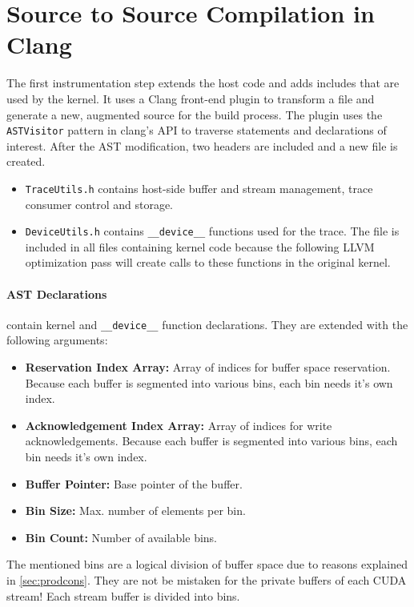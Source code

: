 \section{Source to Source Compilation in Clang}\label{sec:impl:clang}
The first instrumentation step extends the host code and adds includes that are used by the kernel. It uses a Clang front-end plugin to transform a file and generate a new, augmented source for the build process. The plugin uses the \verb|ASTVisitor|
pattern in clang's API to traverse statements and declarations of interest.
After the AST modification, two headers are included and a new file is created.

\begin{itemize}
	\item \verb|TraceUtils.h| contains host-side buffer and stream management, trace consumer control and storage.
	\item \verb|DeviceUtils.h| contains \verb|__device__| functions used for the trace. The file is included in all
	files containing kernel code because the following LLVM optimization pass will create calls to these functions in the original kernel.
\end{itemize}

\paragraph{AST Declarations} contain kernel and \verb|__device__| function declarations. They are extended with the following arguments:
\begin{itemize}
	\item \textbf{Reservation Index Array:} Array of indices for buffer space reservation. Because each buffer is segmented into various bins,
		each bin needs it's own index.
	\item \textbf{Acknowledgement Index Array:} Array of indices for write acknowledgements. Because each buffer is segmented into various bins,
	each bin needs it's own index.
	\item \textbf{Buffer Pointer:} Base pointer of the buffer.
	\item \textbf{Bin Size:} Max. number of elements per bin.
	\item \textbf{Bin Count:} Number of available bins.
\end{itemize}
The mentioned bins are a logical division of buffer space due to reasons explained in \ref{sec:prodcons}. They are not be mistaken 
for the private buffers of each CUDA stream! Each stream buffer is divided into bins.

